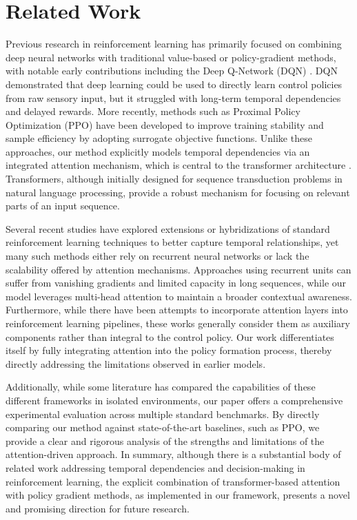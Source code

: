 \section{Related Work}
\label{sec:related}
Previous research in reinforcement learning has primarily focused on combining deep neural networks with traditional value-based or policy-gradient methods, with notable early contributions including the Deep Q-Network (DQN) \cite{mnih_2015_dqn}. DQN demonstrated that deep learning could be used to directly learn control policies from raw sensory input, but it struggled with long-term temporal dependencies and delayed rewards. More recently, methods such as Proximal Policy Optimization (PPO) \cite{schulman_2017_ppo} have been developed to improve training stability and sample efficiency by adopting surrogate objective functions. Unlike these approaches, our method explicitly models temporal dependencies via an integrated attention mechanism, which is central to the transformer architecture \cite{ashish_2017_attention}. Transformers, although initially designed for sequence transduction problems in natural language processing, provide a robust mechanism for focusing on relevant parts of an input sequence.

Several recent studies have explored extensions or hybridizations of standard reinforcement learning techniques to better capture temporal relationships, yet many such methods either rely on recurrent neural networks or lack the scalability offered by attention mechanisms. Approaches using recurrent units can suffer from vanishing gradients and limited capacity in long sequences, while our model leverages multi-head attention to maintain a broader contextual awareness. Furthermore, while there have been attempts to incorporate attention layers into reinforcement learning pipelines, these works generally consider them as auxiliary components rather than integral to the control policy. Our work differentiates itself by fully integrating attention into the policy formation process, thereby directly addressing the limitations observed in earlier models.

Additionally, while some literature has compared the capabilities of these different frameworks in isolated environments, our paper offers a comprehensive experimental evaluation across multiple standard benchmarks. By directly comparing our method against state-of-the-art baselines, such as PPO, we provide a clear and rigorous analysis of the strengths and limitations of the attention-driven approach. In summary, although there is a substantial body of related work addressing temporal dependencies and decision-making in reinforcement learning, the explicit combination of transformer-based attention with policy gradient methods, as implemented in our framework, presents a novel and promising direction for future research.

